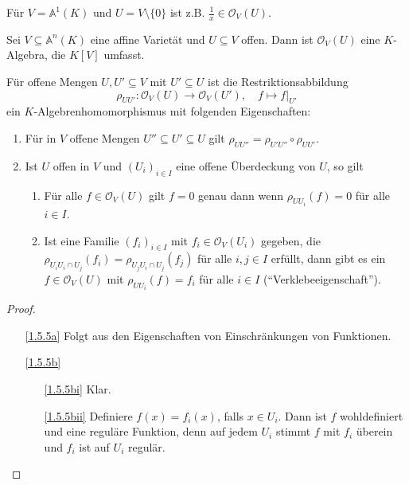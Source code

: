 \documentclass[a4paper,12pt]{scrbook}
\newtheorem{proof}{Beweis}
\def\A{\mathbb{A}}
\def\O{\mathcal{O}}
\newcommand{\ra}{\longrightarrow}
\newcommand{\restrict}[1]{|_{#1}}
\renewcommand{\mapsto}{\longmapsto}
\begin{document}
\begin{nbsp}
  Für $V=\A^1(K)$ und $U=V\setminus\{0\}$ ist z.B. $\frac1x\in\O_V(U)$.
\end{nbsp}

\begin{bem}\label{1.5.4}
  Sei $V\subseteq\A^n(K)$ eine affine Varietät und $U\subseteq V$ offen. Dann ist $\O_V(U)$ eine $K$-Algebra, die $K[V]$
  umfasst.
\end{bem}

\begin{bem}\label{1.5.5}
  Für offene Mengen $U,U'\subseteq V$ mit $U'\subseteq U$ ist die Restriktionsabbildung
  \[ \rho_{UU'}\colon \O_V(U)\ra\O_V(U'),\quad f\mapsto f\restrict{U'} \]
  ein $K$-Algebrenhomomorphismus mit folgenden Eigenschaften:
  \begin{enumerate}
  \item{} Für in $V$ offene Mengen $U''\subseteq U'\subseteq U$ gilt $\rho_{UU''}=\rho_{U'U''}\circ\rho_{UU'}$.
  \item{} Ist $U$ offen in $V$ und $(U_i)_{i\in I}$ eine offene Überdeckung von $U$, so gilt
    \begin{enumerate}
    \item{} Für alle $f\in\O_V(U)$ gilt $f=0$ genau dann wenn $\rho_{UU_i}(f)=0$ für alle $i\in I$.
    \item{} Ist eine Familie $(f_i)_{i\in I}$ mit $f_i\in\O_V(U_i)$ gegeben, die $\rho_{U_iU_i\cap
        U_j}(f_i)=\rho_{U_jU_i\cap U_j}(f_j)$  für alle $i,j\in I$ erfüllt, dann gibt es ein $f\in\O_V(U)$ mit
      $\rho_{UU_i}(f)=f_i$ für alle $i\in I$
      (\enquote{Verklebeeigenschaft}).
    \end{enumerate}
  \end{enumerate}
\end{bem}
\begin{proof}
  \begin{enumerate}
  \item[\ref{1.5.5a}] Folgt aus den Eigenschaften von Einschränkungen von Funktionen.
  \item[\ref{1.5.5b}]
    \begin{enumerate}
    \item[\ref{1.5.5bi}] Klar.
    \item[\ref{1.5.5bii}] Definiere $f(x)=f_i(x)$, falls $x\in U_i$. Dann ist $f$ wohldefiniert und eine reguläre Funktion, denn
      auf jedem $U_i$  stimmt $f$ mit $f_i$ überein und $f_i$ ist auf $U_i$ regulär.
    \end{enumerate}
  \end{enumerate}
\end{proof}
\end{document}
